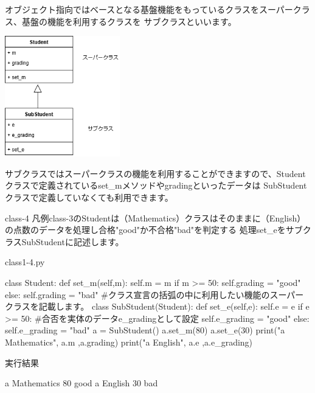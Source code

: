 オブジェクト指向ではベースとなる基盤機能をもっているクラスをスーパークラス、基盤の機能を利用するクラスを
サブクラスといいます。
\begin{center}
\includegraphics[width=5cm]{images/ClassExtends.png}
\end{center}

サブクラスではスーパークラスの機能を利用することができますので、Studentクラスで定義されているset\_mメソッドやgradingといったデータは
SubStudentクラスで定義していなくても利用できます。
\newpage
\begin{pabox}{class-4}
凡例class-3のStudentは（Mathematics）クラスはそのままに（English）の点数のデータを処理し合格"good"か不合格"bad"を判定する
処理set\_eをサブクラスSubStudentに記述します。

\begin{legbox}{class1-4.py}
\begin{listing}{1}
class Student: 
    def set_m(self,m):
        self.m = m
        if m >= 50:
            self.grading = "good"
        else:
            self.grading = "bad"
#クラス宣言の括弧の中に利用したい機能のスーパークラスを記載します。
class SubStudent(Student): 
    def set_e(self,e):
        self.e = e
        if e >= 50:
            #合否を実体のデータe_gradingとして設定
            self.e_grading = "good"
        else:
            self.e_grading = "bad"
a = SubStudent()
a.set_m(80)
a.set_e(30)
print("a Mathematics", a.m ,a.grading)
print("a English", a.e ,a.e_grading)
\end{listing}
実行結果
\begin{listing}{1}
a  Mathematics 80 good
a  English 30 bad
\end{listing}
\end{legbox}


\end{pabox}

